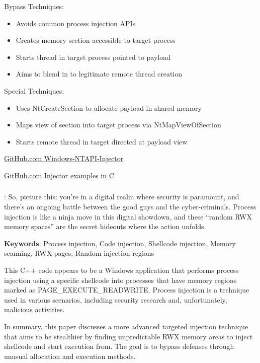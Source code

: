 \documentclass{article}
\begin{document}
Bypass Techniques:
\begin{itemize}
\item Avoids common process injection APIs
\item Creates memory section accessible to target process
\item Starts thread in target process pointed to payload
\item Aims to blend in to legitimate remote thread creation
\end{itemize}

Special Techniques:
\begin{itemize}
\item Uses NtCreateSection to allocate payload in shared memory
\item Maps view of section into target process via NtMapViewOfSection
\item Starts remote thread in target directed at payload view
\end{itemize}


\href{https://github.com/elddy/Windows-NTAPI-Injector}{GitHub.com Windows-NTAPI-Injector}

\href{https://gist.github.com/WKL-Sec/96e17188e4c159c2cdf7ff2c111130cc#file-local-c}{GitHub.com Injector examples in C}


\subsubsection{\textcite{S12h4ck:2023b}}
\textbf{}:  So, picture this: you’re in a digital realm where security is paramount, and there’s an ongoing battle between the good guys and the cyber-criminals. Process injection is like a ninja move in this digital showdown, and these “random RWX memory spaces” are the secret hideouts where the action unfolds.

\textbf{Keywords}: Process injection, Code injection, Shellcode injection, Memory scanning, RWX pages, Random injection regions

This C++ code appears to be a Windows application that performs process injection using a specific shellcode into processes that have memory regions marked as PAGE\_EXECUTE\_READWRITE. Process injection is a technique used in various scenarios, including security research and, unfortunately, malicious activities.


In summary, this paper discusses a more advanced targeted injection technique that aims to be stealthier by finding unpredictable RWX memory areas to inject shellcode and start execution from. The goal is to bypass defenses through unusual allocation and execution methods.
\end{document}
